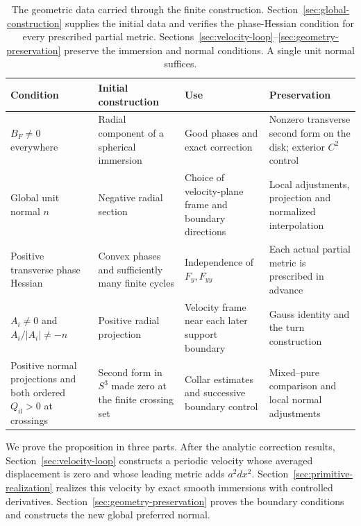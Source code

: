 \begin{table}[htbp]
\centering
\small
\renewcommand{\arraystretch}{1.18}
\begin{tabular}{@{}>{\raggedright\arraybackslash}p{.21\linewidth}>{\raggedright\arraybackslash}p{.24\linewidth}>{\raggedright\arraybackslash}p{.23\linewidth}>{\raggedright\arraybackslash}p{.23\linewidth}@{}}
\toprule
Condition & Initial construction & Use & Preservation \\
\midrule
$B_F\ne0$ everywhere
& Radial component of a spherical immersion
& Good phases and exact correction
& Nonzero transverse second form on the disk; exterior $C^2$ control \\
Global unit normal $n$
& Negative radial section
& Choice of velocity-plane frame and boundary directions
& Local adjustments, projection and normalized interpolation \\
Positive transverse phase Hessian
& Convex phases and sufficiently many finite cycles
& Independence of $F_y,F_{yy}$
& Each actual partial metric is prescribed in advance \\
$A_i\ne0$ and $A_i/|A_i|\ne-n$
& Positive radial projection
& Velocity frame near each later support boundary
& Gauss identity and the turn construction \\
Positive normal projections and both ordered $Q_{il}>0$ at crossings
& Second form in $S^3$ made zero at the finite crossing set
& Collar estimates and successive boundary control
& Mixed--pure comparison and local normal adjustments \\
\bottomrule
\end{tabular}
\caption{The geometric data carried through the finite construction.
Section~\ref{sec:global-construction} supplies the initial data and verifies
the phase-Hessian condition for every prescribed partial metric.
Sections~\ref{sec:velocity-loop}--\ref{sec:geometry-preservation}
preserve the immersion and normal conditions.  A single unit normal suffices.}
\label{tab:invariants}
\end{table}

We prove the proposition in three parts.  After the analytic correction
results, Section~\ref{sec:velocity-loop} constructs a periodic velocity
whose averaged displacement is zero and whose leading metric adds
$a^2dx^2$.  Section~\ref{sec:primitive-realization} realizes this velocity
by exact smooth immersions with controlled derivatives.
Section~\ref{sec:geometry-preservation} proves the boundary conditions and
constructs the new global preferred normal.
